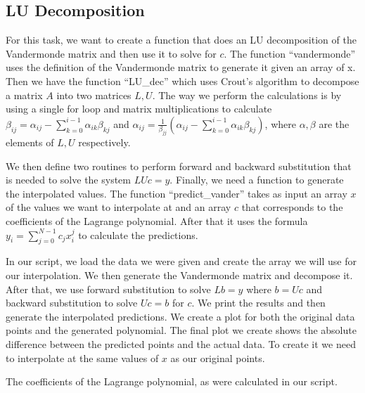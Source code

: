 \documentclass[a4paper,10pt]{article}
\begin{document}
\subsection{LU Decomposition}
\label{chap:lu_dec}



For this task, we want to create a function that does an LU decomposition of the Vandermonde matrix and then use it to solve for $c$. The function ``vandermonde'' uses the definition of the Vandermonde matrix to generate it given an array of x. Then we have the function ``LU\_dec'' which uses Crout's algorithm to decompose a matrix $A$ into two matrices $L, U$. The way we perform the calculations is by using a single for loop and matrix multiplications to calculate $\beta_{ij}=\alpha_{ij}-\sum_{k=0}^{i-1}\alpha_{ik}\beta_{kj}$ and $\alpha_{ij}=\frac{1}{\beta_{jj}}(\alpha_{ij}-\sum_{k=0}^{i-1}\alpha_{ik}\beta_{kj})$, where $\alpha,\beta$ are the elements of $L,U$ respectively.

We then define two routines to perform forward and backward substitution that is needed to solve the system $LUc=y$. Finally, we need a function to generate the interpolated values. The function ``predict\_vander'' takes as input an array $x$ of the values we want to interpolate at and an array $c$ that corresponds to the coefficients of the Lagrange polynomial. After that it uses the formula $y_i=\sum_{j=0}^{N-1}c_j x_i^j$ to calculate the predictions.

In our script, we load the data we were given and create the array we will use for our interpolation. We then generate the Vandermonde matrix and decompose it. After that, we use forward substitution to solve $Lb=y$ where $b=Uc$ and backward substitution to solve $Uc=b$ for $c$. We print the results and then generate the interpolated predictions. We create a plot for both the original data points and the generated polynomial. The final plot we create shows the absolute difference between the predicted points and the actual data. To create it we need to interpolate at the same values of $x$ as our original points.   



The coefficients of the Lagrange polynomial, as were calculated in our script.
\end{document}
